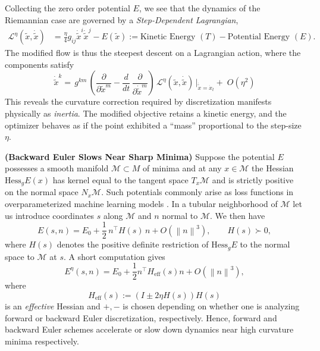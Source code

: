 \documentclass[reqno,11pt,letterpaper]{amsart}
\theoremstyle{plain}
\theoremstyle{definition}
\theoremstyle{remark}
\newcommand{\norm}[1]{\left\lVert#1\right\rVert}
\begin{document}
Collecting the zero order potential $E$, we see that the dynamics of the Riemannian case are governed by a \emph{Step-Dependent Lagrangian},
\begin{align*}
\mathcal{L}^{\eta}(\tilde{x}, \dot{\tilde{x}}) &=  \frac{\eta}{4} g_{ij} \Dot{\tilde{x}}^{i} \Dot{\tilde{x}}^{j}- E(\tilde{x}):= \textrm{Kinetic Energy }(T) - {\textrm{Potential Energy }(E) 
}. 
\end{align*}
The modified flow is thus the steepest descent on a Lagrangian action, where the components satisfy
\[
\Dot{\tilde{x}}^{k} = \,g^{km} \,\left(
\frac{\partial}{\partial \tilde{x}^{m}}
-\frac{d}{dt}\,\frac{\partial}{\partial \dot{\tilde{x}}^{m}}
\right)\,
\mathcal{L}^{\eta}(\tilde{x}, \dot{\tilde{x}})\, \bigg|_{\dot{\tilde{x}} = \dot{x}_{t}}
+\;O(\eta^{2})
\]
This reveals the curvature correction required by discretization manifests physically as \emph{inertia}. The modified objective retains a kinetic energy, and the optimizer behaves as if the point exhibited a ``mass'' proportional to the step-size $\eta$.



\textbf{(Backward Euler Slows Near Sharp Minima)} Suppose the potential $E$ possesses a smooth manifold $\mathcal{M}\subset M$ of minima and at any $x\in \mathcal{M}$ the Hessian $\mathrm{Hess}_g E(x)$ has kernel equal to the tangent space $T_{x}\mathcal{M}$ and is strictly positive on the normal space $N_{x}\mathcal{M}$.  Such potentials  commonly arise as loss functions in overparameterized machine learning models \cite{liu2022loss}. In a tubular neighborhood of $\mathcal M$ let us introduce coordinates $s$ along $\mathcal M$ and $n$ normal to $\mathcal M$. We then have
    \begin{equation}\label{eq:M-exp}
        E(s,n) = E_0 + \frac{1}{2}\, n^\top H(s)\, n + O(\norm{n}^3),
    \qquad H(s) \succ 0,    
    \end{equation}
    where $H(s)$ denotes the positive definite restriction of $\mathrm{Hess}_g E$ to the normal space to $\mathcal M$ at $s$. A short computation gives 
    \[
        E^\eta(s,n) = E_0 + \frac{1}{2} n^\top H_{\mathrm{eff}}(s) n + O(\norm{n}^3),
    \]
    where
    \begin{equation}\label{eq:Hess-eff-def}
        H_{\mathrm{eff}}(s) :=(I\pm 2\eta H(s))H(s)
    \end{equation}
    is an \textit{effective} Hessian and $+,-$ is chosen depending on whether one is analyzing forward or backward Euler discretization, respectively. Hence, forward and backward Euler schemes accelerate or slow down  dynamics near high curvature minima respectively.
\end{document}
